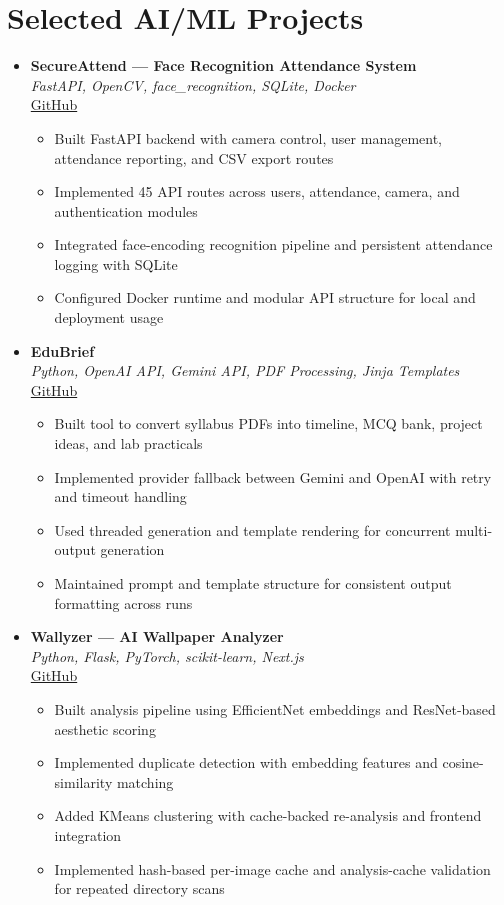 \documentclass[11pt,a4paper]{article}
\newcommand{\resumeItem}[1]{
  \item\small{#1 \vspace{-1pt}}
}
\begin{document}
\section{Selected AI/ML Projects}
\begin{itemize}[leftmargin=*]

\item \textbf{SecureAttend --- Face Recognition Attendance System} \\
\textit{FastAPI, OpenCV, face\_recognition, SQLite, Docker} \\
\href{https://github.com/Dhairya3391/SecureAttend}{GitHub}
\begin{itemize}[leftmargin=*]
  \resumeItem{Built FastAPI backend with camera control, user management, attendance reporting, and CSV export routes}
  \resumeItem{Implemented 45 API routes across users, attendance, camera, and authentication modules}
  \resumeItem{Integrated face-encoding recognition pipeline and persistent attendance logging with SQLite}
  \resumeItem{Configured Docker runtime and modular API structure for local and deployment usage}
\end{itemize}

\item \textbf{EduBrief} \\
\textit{Python, OpenAI API, Gemini API, PDF Processing, Jinja Templates} \\
\href{https://github.com/Dhairya3391/EduBrief}{GitHub}
\begin{itemize}[leftmargin=*]
  \resumeItem{Built tool to convert syllabus PDFs into timeline, MCQ bank, project ideas, and lab practicals}
  \resumeItem{Implemented provider fallback between Gemini and OpenAI with retry and timeout handling}
  \resumeItem{Used threaded generation and template rendering for concurrent multi-output generation}
  \resumeItem{Maintained prompt and template structure for consistent output formatting across runs}
\end{itemize}

\item \textbf{Wallyzer --- AI Wallpaper Analyzer} \\
\textit{Python, Flask, PyTorch, scikit-learn, Next.js} \\
\href{https://github.com/Dhairya3391/wallyzer}{GitHub}
\begin{itemize}[leftmargin=*]
  \resumeItem{Built analysis pipeline using EfficientNet embeddings and ResNet-based aesthetic scoring}
  \resumeItem{Implemented duplicate detection with embedding features and cosine-similarity matching}
  \resumeItem{Added KMeans clustering with cache-backed re-analysis and frontend integration}
  \resumeItem{Implemented hash-based per-image cache and analysis-cache validation for repeated directory scans}
\end{itemize}


\end{itemize}
\end{document}
